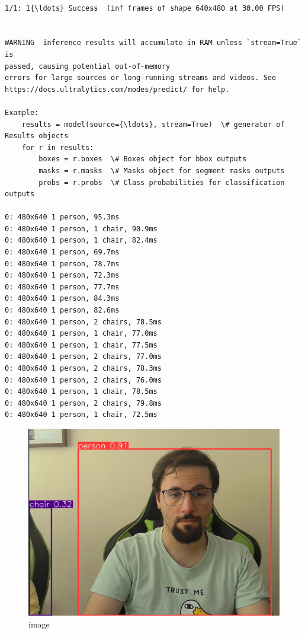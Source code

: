 \documentclass[11pt]{article}
\makeatletter
\newcommand{\boxspacing}{\kern\kvtcb@left@rule\kern\kvtcb@boxsep}
\newcommand{\prompt}[4]{
        {\ttfamily\llap{{\color{#2}[#3]:\hspace{3pt}#4}}\vspace{-\baselineskip}}
    }
\makeatother
\begin{document}
\begin{tcolorbox}[breakable, size=fbox, boxrule=1pt, pad at break*=1mm,colback=cellbackground, colframe=cellborder]
    \prompt{Out}{outcolor}{1}{\boxspacing}
    \begin{Verbatim}[commandchars=\\\{\}]
        
1/1: 1{\ldots} Success  (inf frames of shape 640x480 at 30.00 FPS)


WARNING  inference results will accumulate in RAM unless `stream=True` is
passed, causing potential out-of-memory
errors for large sources or long-running streams and videos. See
https://docs.ultralytics.com/modes/predict/ for help.

Example:
    results = model(source={\ldots}, stream=True)  \# generator of Results objects
    for r in results:
        boxes = r.boxes  \# Boxes object for bbox outputs
        masks = r.masks  \# Masks object for segment masks outputs
        probs = r.probs  \# Class probabilities for classification outputs

0: 480x640 1 person, 95.3ms
0: 480x640 1 person, 1 chair, 90.9ms
0: 480x640 1 person, 1 chair, 82.4ms
0: 480x640 1 person, 69.7ms
0: 480x640 1 person, 78.7ms
0: 480x640 1 person, 72.3ms
0: 480x640 1 person, 77.7ms
0: 480x640 1 person, 84.3ms
0: 480x640 1 person, 82.6ms
0: 480x640 1 person, 2 chairs, 78.5ms
0: 480x640 1 person, 1 chair, 77.0ms
0: 480x640 1 person, 1 chair, 77.5ms
0: 480x640 1 person, 2 chairs, 77.0ms
0: 480x640 1 person, 2 chairs, 78.3ms
0: 480x640 1 person, 2 chairs, 76.0ms
0: 480x640 1 person, 1 chair, 78.5ms
0: 480x640 1 person, 2 chairs, 79.8ms
0: 480x640 1 person, 1 chair, 72.5ms
    \end{Verbatim}
\end{tcolorbox}

    \begin{figure}
\centering
\includegraphics{imgs/camara sin tracker.png}
\caption{image}
\end{figure}
\end{document}
